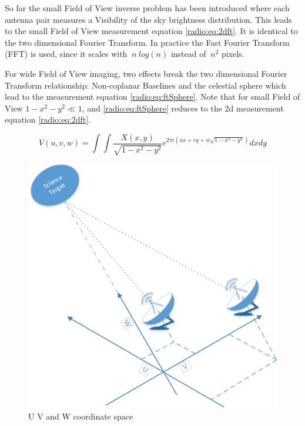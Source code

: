 So far the small Field of View inverse problem has been introduced where each antenna pair measures a Visibility of the sky brightness distribution. This leads to the small Field of View measurement equation \eqref{radio:eq:2dft}. It is identical to the two dimensional Fourier Transform. In practice the Fast Fourier Transform (FFT) is used, since it scales with $~n\:log(n)$ instead of $~n^2$ pixels.



For wide Field of View imaging, two effects break the two dimensional Fourier Transform relationship: Non-coplanar Baselines and the celestial sphere which lead to the measurement equation \eqref{radio:eq:ftSphere}. Note that for small Field of View $1 - x^2 -y ^2 \ll 1$, and \eqref{radio:eq:ftSphere} reduces to the 2d measurement equation \eqref{radio:eq:2dft}.

\begin{equation}\label{meerkat:ftsphere}
	V(u, v, w) = \int\int \frac{X(x, y)}{\sqrt{1 - x^2 - y ^2}} e^{2 \pi i (ux+vy+ w\sqrt{1 - x^2 - y ^2})}dx dy
\end{equation}

\begin{figure}
	\centering
	\includegraphics[width=0.9\linewidth]{./chapters/03.radio/uvw.png}
	\caption{U V and W coordinate space}
	\label{radio:uvw}
	\vspace{-10pt}
\end{figure}

